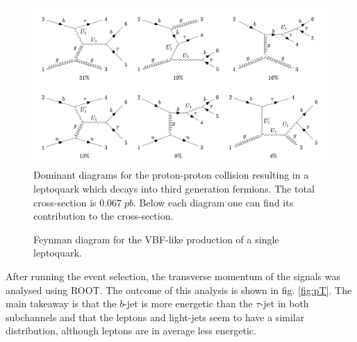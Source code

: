 \begin{figure}
    \centering
    \includegraphics[width=\textwidth]{images/dominant_diagrams.png}
    \caption{Dominant diagrams for the proton-proton collision resulting in a leptoquark which decays into third generation fermions. The total cross-section is $0.067\;\si{pb}$. Below each diagram one can find its contribution to the cross-section.}
    \label{fig:dominant}
\end{figure}

\begin{figure}
    \centering
    \caption{Feynman diagram for the VBF-like production of a single leptoquark.}
    \label{fig:feynman-VBFlike}
\end{figure}

After running the event selection, the transverse momentum of the signals was analysed using ROOT. The outcome of this analysis is shown in fig. \ref{fig:pT}. The main takeaway is that the $b$-jet is more energetic than the $\tau$-jet in both subchannels and that the leptons and light-jets seem to have a similar distribution, although leptons are in average less energetic. 

